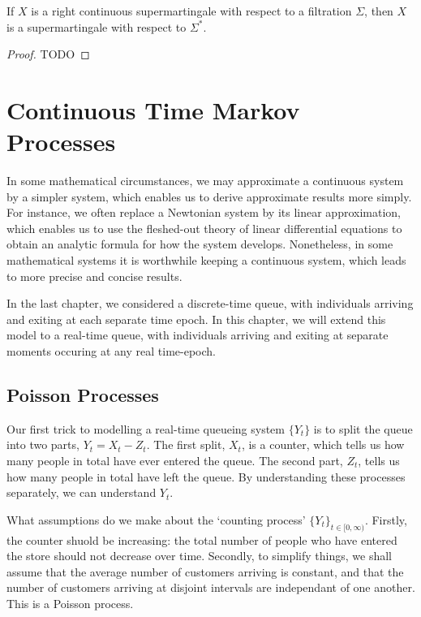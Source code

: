 \begin{lemma}
    If $X$ is a right continuous supermartingale with respect to a filtration $\Sigma$, then $X$ is a supermartingale with respect to $\Sigma^*$.
\end{lemma}
\begin{proof}
    TODO
\end{proof}

\chapter{Continuous Time Markov Processes}

In some mathematical circumstances, we may approximate a continuous system by a simpler system, which enables us to derive approximate results more simply. For instance, we often replace a Newtonian system by its linear approximation, which enables us to use the fleshed-out theory of linear differential equations to obtain an analytic formula for how the system develops. Nonetheless, in some mathematical systems it is worthwhile keeping a continuous system, which leads to more precise and concise results.

In the last chapter, we considered a discrete-time queue, with individuals arriving and exiting at each separate time epoch. In this chapter, we will extend this model to a real-time queue, with individuals arriving and exiting at separate moments occuring at any real time-epoch.

\section{Poisson Processes}

Our first trick to modelling a real-time queueing system $\{ Y_t \}$ is to split the queue into two parts, $Y_t = X_t - Z_t$. The first split, $X_t$, is a counter, which tells us how many people in total have ever entered the queue. The second part, $Z_t$, tells us how many people in total have left the queue. By understanding these processes separately, we can understand $Y_t$.

What assumptions do we make about the `counting process' $\{ Y_t \}_{t \in [0,\infty)}$. Firstly, the counter shuold be increasing: the total number of people who have entered the store should not decrease over time. Secondly, to simplify things, we shall assume that the average number of customers arriving is constant, and that the number of customers arriving at disjoint intervals are independant of one another. This is a Poisson process.

